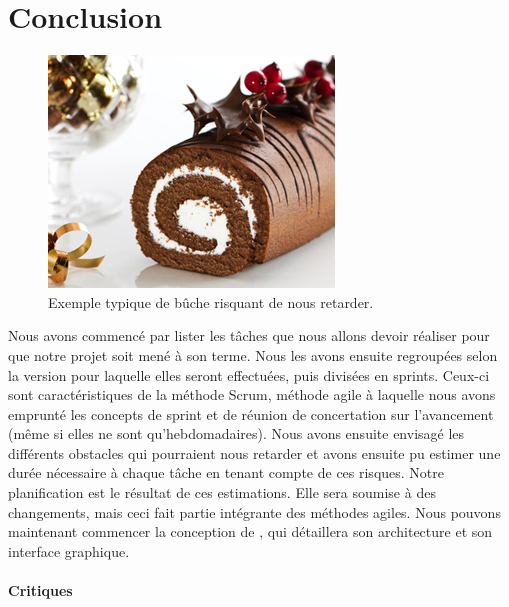 \section{Conclusion}
	\label{sec:conclusion}


	\begin{figure}[h]
		\centering
		\includegraphics{figure/buche.jpg}
		\caption{Exemple typique de bûche risquant de nous retarder.}
		\label{fig:buche}
	\end{figure}


	Nous avons commencé par lister les tâches que nous allons devoir réaliser pour que notre projet soit mené à son terme. Nous les avons ensuite regroupées selon la version pour laquelle elles seront effectuées, puis divisées en sprints. Ceux-ci sont caractéristiques de la méthode Scrum, méthode agile à laquelle nous avons emprunté les concepts de sprint et de réunion de concertation sur l'avancement (même si elles ne sont qu'hebdomadaires). Nous avons ensuite envisagé les différents obstacles qui pourraient nous retarder et avons ensuite pu estimer une durée nécessaire à chaque tâche en tenant compte de ces risques. Notre planification est le résultat de ces estimations. Elle sera soumise à des changements, mais ceci fait partie intégrante des méthodes agiles. Nous pouvons maintenant commencer la conception de \glasir{}, qui détaillera son architecture et son interface graphique.
	\paragraph{Critiques}